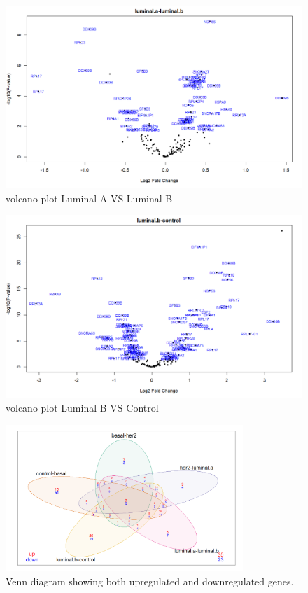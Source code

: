 \documentclass[journal]{IEEEtran}
\begin{document}
\begin{figure}
    \centering
    \includegraphics[width=.8\textwidth]{images/DE/volcano4DE.jpg}
    \caption{volcano plot Luminal A VS Luminal B}
    \label{fig:volcano4DE}
\end{figure}

\begin{figure}
    \centering
    \includegraphics[width=.8\textwidth]{images/DE/volcano5DE.jpg}
    \caption{volcano plot Luminal B VS Control}
    \label{fig:volcano5DE}
\end{figure}

\begin{figure}
    \centering
    \includegraphics[width=0.8\textwidth]{images/DE/Venn_Up_and_down.jpg}
    \caption{Venn diagram showing both upregulated and downregulated genes.}
    \label{fig:VennDE_copy}
\end{figure}
\end{document}
